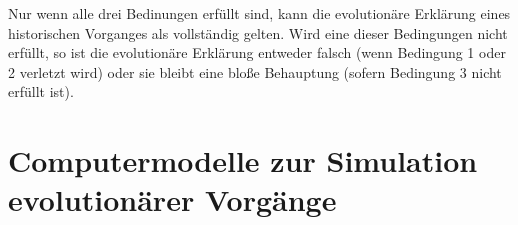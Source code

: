 \documentclass[12pt,a4paper,ngerman]{article}
\begin{document}
Nur wenn alle drei Bedinungen erfüllt sind, kann die evolutionäre
Erklärung eines historischen Vorganges als vollständig gelten. Wird
eine dieser Bedingungen nicht erfüllt, so ist die evolutionäre
Erklärung entweder falsch (wenn Bedingung 1 oder 2 verletzt wird) oder
sie bleibt eine bloße Behauptung (sofern Bedingung 3 nicht erfüllt
ist).


\section{Computermodelle zur Simulation evolutionärer Vorgänge}
\end{document}
